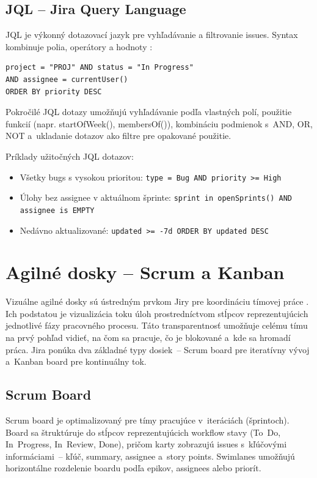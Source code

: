 \subsection{JQL -- Jira Query Language}

JQL je výkonný dotazovací jazyk pre vyhľadávanie a filtrovanie issues. Syntax kombinuje polia, operátory a hodnoty \cite{atlassian_jql2024}:

\begin{verbatim}
project = "PROJ" AND status = "In Progress"
AND assignee = currentUser()
ORDER BY priority DESC
\end{verbatim}

Pokročilé JQL dotazy umožňujú vyhľadávanie podľa vlastných polí, použitie funkcií (napr. startOfWeek(), membersOf()), kombináciu podmienok s~AND, OR, NOT a~ukladanie dotazov ako filtre pre opakované použitie.

Príklady užitočných JQL dotazov:
\begin{itemize}
    \item Všetky bugs s vysokou prioritou: \texttt{type = Bug AND priority >= High}
    \item Úlohy bez assignee v aktuálnom šprinte: \texttt{sprint in openSprints() AND assignee is EMPTY}
    \item Nedávno aktualizované: \texttt{updated >= -7d ORDER BY updated DESC}
\end{itemize}

\section{Agilné dosky -- Scrum a Kanban}

Vizuálne agilné dosky sú ústredným prvkom Jiry pre koordináciu tímovej práce \cite{atlassian_kanban2024}. Ich podstatou je vizualizácia toku úloh prostredníctvom stĺpcov reprezentujúcich jednotlivé fázy pracovného procesu. Táto transparentnosť umožňuje celému tímu na prvý pohľad vidieť, na čom sa pracuje, čo je blokované a~kde sa hromadí práca. Jira ponúka dva základné typy dosiek~-- Scrum board pre iteratívny vývoj a~Kanban board pre kontinuálny tok.

\subsection{Scrum Board}

Scrum board je optimalizovaný pre tímy pracujúce v~iteráciách (šprintoch). Board sa štruktúruje do stĺpcov reprezentujúcich workflow stavy (To~Do, In~Progress, In~Review, Done), pričom karty zobrazujú issues s~kľúčovými informáciami~-- kľúč, summary, assignee a~story points. Swimlanes umožňujú horizontálne rozdelenie boardu podľa epikov, assignees alebo priorít.


